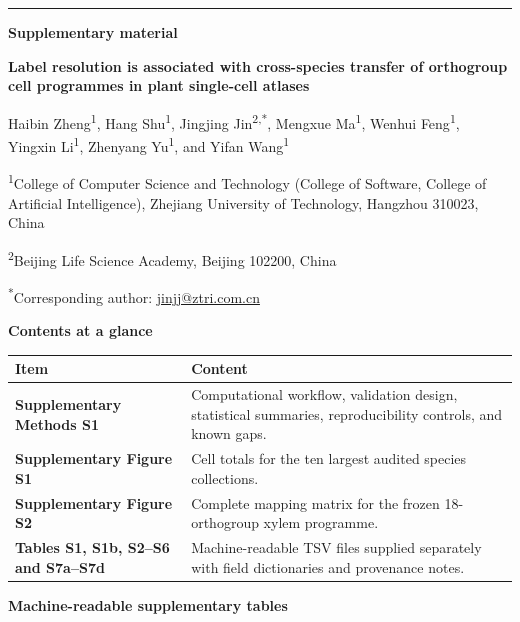 \documentclass[10pt]{article}
\begin{document}
\thispagestyle{empty}
{\color{plhopgreen}\rule{\textwidth}{1.2pt}}
\vspace{8mm}

{\Large\bfseries Supplementary material\par}
\vspace{4mm}
{\LARGE\bfseries Label resolution is associated with cross-species transfer of orthogroup cell programmes in plant single-cell atlases\par}

\vspace{7mm}
{\large Haibin Zheng\textsuperscript{1}, Hang Shu\textsuperscript{1}, Jingjing Jin\textsuperscript{2,*}, Mengxue Ma\textsuperscript{1}, Wenhui Feng\textsuperscript{1}, Yingxin Li\textsuperscript{1}, Zhenyang Yu\textsuperscript{1}, and Yifan Wang\textsuperscript{1}\par}

\vspace{5mm}
\textsuperscript{1}College of Computer Science and Technology (College of Software, College of Artificial Intelligence), Zhejiang University of Technology, Hangzhou 310023, China

\textsuperscript{2}Beijing Life Science Academy, Beijing 102200, China

\textsuperscript{*}Corresponding author: \href{mailto:jinjj@ztri.com.cn}{jinjj@ztri.com.cn}

\vspace{8mm}
{\large\bfseries Contents at a glance}

\begin{tabularx}{\textwidth}{@{}>{\bfseries}p{}X@{}}
\toprule
Item & Content \\
\midrule
Supplementary Methods S1 & Computational workflow, validation design, statistical summaries, reproducibility controls, and known gaps. \\
Supplementary Figure S1 & Cell totals for the ten largest audited species collections. \\
Supplementary Figure S2 & Complete mapping matrix for the frozen 18-orthogroup xylem programme. \\
Tables S1, S1b, S2--S6 and S7a--S7d & Machine-readable TSV files supplied separately with field dictionaries and provenance notes. \\
\bottomrule
\end{tabularx}

\vspace{6mm}
{\large\bfseries Machine-readable supplementary tables}
\end{document}
